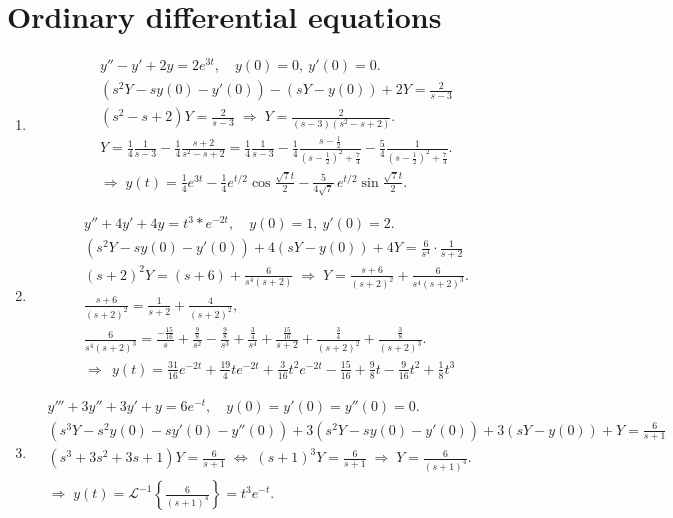 \documentclass[11pt]{article}
\begin{document}
\section{Ordinary differential equations}
\begin{enumerate}[label=(\arabic*)]
\item
\[
\begin{aligned}
&y''-y'+2y=2e^{3t},\quad y(0)=0,\ y'(0)=0.\\[2pt]
&(s^2Y - sy(0) - y'(0)) - (sY - y(0)) + 2Y = \frac{2}{s-3} \\[2pt]
&(s^2 - s + 2)Y = \frac{2}{s-3}
\;\Rightarrow\;
Y=\frac{2}{(s-3)(s^2 - s + 2)}.\\
&Y=\frac{1}{4}\frac{1}{s-3}-\frac{1}{4}\frac{s+2}{s^2 - s + 2}
=\frac{1}{4}\frac{1}{s-3}-\frac{1}{4}\frac{s-\tfrac12}{(s-\tfrac12)^2+\tfrac{7}{4}}-\frac{5}{4}\frac{1}{(s-\tfrac12)^2+\tfrac{7}{4}}.\\
&\Rightarrow\;
y(t)=\frac{1}{4}e^{3t}-\frac{1}{4}e^{t/2}\cos\!\frac{\sqrt7 t}{2}
-\frac{5}{4\sqrt7}\,e^{t/2}\sin\!\frac{\sqrt7 t}{2}.
\end{aligned}
\]

\item
\[
\begin{aligned}
&y''+4y'+4y=t^3*e^{-2t},\quad y(0)=1,\ y'(0)=2.\\[2pt]
&(s^2Y-sy(0)-y'(0))+4(sY-y(0))+4Y=\frac{6}{s^4}\cdot\frac{1}{s+2} \\[2pt]
&(s+2)^2Y=(s+6)+\frac{6}{s^4(s+2)}
\;\Rightarrow\;
Y=\frac{s+6}{(s+2)^2}+\frac{6}{s^4(s+2)^3}.\\
&\frac{s+6}{(s+2)^2}=\frac{1}{s+2}+\frac{4}{(s+2)^2},\\[2pt]
&\frac{6}{s^4(s+2)^3}
=\frac{-\tfrac{15}{16}}{s}+\frac{\tfrac{9}{8}}{s^2}-\frac{\tfrac{9}{8}}{s^3}
+\frac{\tfrac{3}{4}}{s^4}
+\frac{\tfrac{15}{16}}{s+2}+\frac{\tfrac{3}{4}}{(s+2)^2}+\frac{\tfrac{3}{8}}{(s+2)^3}.\\
&\Rightarrow\;
\,y(t)=\frac{31}{16}e^{-2t}+\frac{19}{4}t e^{-2t}+\frac{3}{16}t^2 e^{-2t}
-\frac{15}{16}+\frac{9}{8}t-\frac{9}{16}t^2+\frac{1}{8}t^3
\end{aligned}
\]

\item
\[
\begin{aligned}
&y'''+3y''+3y'+y=6e^{-t},\quad y(0)=y'(0)=y''(0)=0.\\[2pt]
&(s^3Y-s^2y(0)-s y'(0)-y''(0))
+3(s^2Y-sy(0)-y'(0))
+3(sY-y(0))+Y=\frac{6}{s+1}\\[2pt]
&(s^3+3s^2+3s+1)Y=\frac{6}{s+1}
\;\Leftrightarrow\;
(s+1)^3 Y=\frac{6}{s+1}
\;\Rightarrow\;
Y=\frac{6}{(s+1)^4}.\\
&\Rightarrow\;
y(t)=\mathcal{L}^{-1}\!\left\{\frac{6}{(s+1)^4}\right\}
= t^{3}e^{-t}.
\end{aligned}
\]


\end{enumerate}
\end{document}
